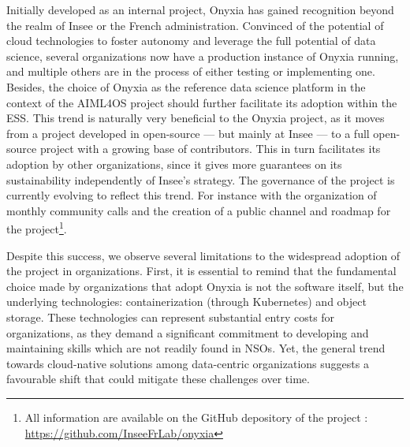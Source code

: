 \documentclass[graybox]{svmult}
\begin{document}
Initially developed as an internal project, Onyxia has gained recognition beyond the realm of Insee or the French administration. Convinced of the potential of cloud technologies to foster autonomy and leverage the full potential of data science, several organizations now have a production instance of Onyxia running, and multiple others are in the process of either testing or implementing one. Besides, the choice of Onyxia as the reference data science platform in the context of the AIML4OS project should further facilitate its adoption within the ESS. This trend is naturally very beneficial to the Onyxia project, as it moves from a project developed in open-source — but mainly at Insee — to a full open-source project with a growing base of contributors. This in turn facilitates its adoption by other organizations, since it gives more guarantees on its sustainability independently of Insee's strategy. The governance of the project is currently evolving to reflect this trend. For instance with the organization of monthly community calls and the creation of a public channel and roadmap for the project\footnote{All information are available on the GitHub depository of the project : \url{https://github.com/InseeFrLab/onyxia}}.

Despite this success, we observe several limitations to the widespread adoption of the project in organizations. First, it is essential to remind that the fundamental choice made by organizations that adopt Onyxia is not the software itself, but the underlying technologies: containerization (through Kubernetes) and object storage. These technologies can represent substantial entry costs for organizations, as they demand a significant commitment to developing and maintaining skills which are not readily found in NSOs. Yet, the general trend towards cloud-native solutions among data-centric organizations suggests a favourable shift that could mitigate these challenges over time.
\end{document}
